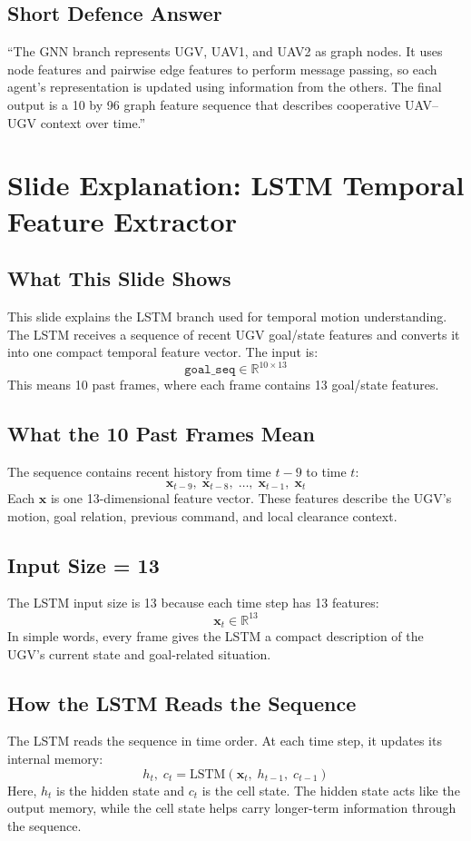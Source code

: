 \documentclass[11pt,a4paper]{article}
\begin{document}
\subsection*{Short Defence Answer}
``The GNN branch represents UGV, UAV1, and UAV2 as graph nodes. It uses node
features and pairwise edge features to perform message passing, so each agent's
representation is updated using information from the others. The final output is
a 10 by 96 graph feature sequence that describes cooperative UAV--UGV context
over time.''

\newpage
\section*{Slide Explanation: LSTM Temporal Feature Extractor}

\subsection*{What This Slide Shows}
This slide explains the LSTM branch used for temporal motion understanding. The
LSTM receives a sequence of recent UGV goal/state features and converts it into
one compact temporal feature vector. The input is:
\[
    \texttt{goal\_seq} \in \mathbb{R}^{10 \times 13}
\]
This means 10 past frames, where each frame contains 13 goal/state features.

\subsection*{What the 10 Past Frames Mean}
The sequence contains recent history from time \(t-9\) to time \(t\):
\[
    \mathbf{x}_{t-9},\; \mathbf{x}_{t-8},\; \ldots,\; \mathbf{x}_{t-1},\; \mathbf{x}_{t}
\]
Each \(\mathbf{x}\) is one 13-dimensional feature vector. These features
describe the UGV's motion, goal relation, previous command, and local clearance
context.

\subsection*{Input Size = 13}
The LSTM input size is 13 because each time step has 13 features:
\[
    \mathbf{x}_t \in \mathbb{R}^{13}
\]
In simple words, every frame gives the LSTM a compact description of the UGV's
current state and goal-related situation.

\subsection*{How the LSTM Reads the Sequence}
The LSTM reads the sequence in time order. At each time step, it updates its
internal memory:
\[
    h_t,\; c_t = \text{LSTM}(\mathbf{x}_t,\; h_{t-1},\; c_{t-1})
\]
Here, \(h_t\) is the hidden state and \(c_t\) is the cell state. The hidden state
acts like the output memory, while the cell state helps carry longer-term
information through the sequence.
\end{document}
